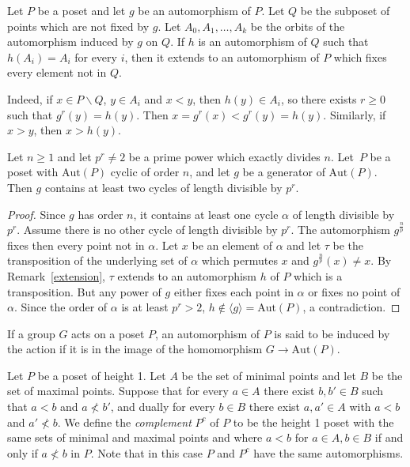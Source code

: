 \documentclass[ALCO,published]{cedram}
\newcommand{\aut}{\textrm{Aut}}
\begin{document}
\begin{obs} \label{extension}
Let $P$ be a poset and let $g$ be an automorphism of $P$. Let $Q$ be the subposet of points which are not fixed by $g$. Let $A_0,A_1,\ldots, A_k$ be the orbits of the automorphism induced by $g$ on $Q$. If $h$ is an automorphism of $Q$ such that $h(A_i)=A_i$ for every $i$, then it extends to an automorphism of $P$ which fixes every element not in $Q$.

Indeed, if $x\in P\smallsetminus Q$, $y\in A_i$ and $x<y$, then $h(y)\in A_i$, so there exists $r\ge 0$ such that $g^r(y)=h(y)$. Then $x=g^r(x)<g^r(y)=h(y)$. Similarly, if $x>y$, then $x>h(y)$.
\end{obs}

\begin{lema} \label{dos}
Let $n\ge 1$ and let $p^r\neq 2$ be a prime power which exactly divides $n$. Let~$P$ be a poset with $\aut(P)$ cyclic of order $n$, and let $g$ be a generator of $\aut (P)$. Then $g$ contains at least two cycles of length divisible by $p^r$. 
\end{lema}
\begin{proof}
Since $g$ has order $n$, it contains at least one cycle $\alpha$ of length divisible by $p^r$. Assume there is no other cycle of length divisible by $p^r$. The automorphism $g^{\frac{n}{p}}$ fixes then every point not in $\alpha$. Let $x$ be an element of $\alpha$ and let $\tau$ be the transposition of the underlying set of $\alpha$ which permutes $x$ and $g^{\frac{n}{p}}(x)\neq x$. By Remark~\ref{extension}, $\tau$ extends to an automorphism $h$ of $P$ which is a transposition. But any power of $g$ either fixes each point in $\alpha$ or fixes no point of $\alpha$. Since the order of $\alpha$ is at least $p^r>2$, $h \notin \langle g\rangle=\aut(P)$, a contradiction.  
\end{proof}

If a group $G$ acts on a poset $P$, an automorphism of $P$ is said to be induced by the action if it is in the image of the homomorphism $G\to \aut(P)$. 

Let $P$ be a poset of height 1. Let $A$ be the set of minimal points and let $B$ be the set of maximal points. Suppose that for every $a\in A$ there exist $b,b'\in B$ such that $a<b$ and $a\nless b'$, and dually for every $b\in B$ there exist $a,a'\in A$ with $a<b$ and $a'\nless b$. We define the \emph{complement} $P^c$ of $P$ to be the height 1 poset with the same sets of minimal and maximal points and where $a<b$ for $a\in A, b\in B$ if and only if $a\nless b$ in $P$. Note that in this case $P$ and $P^c$ have the same automorphisms.
\end{document}
